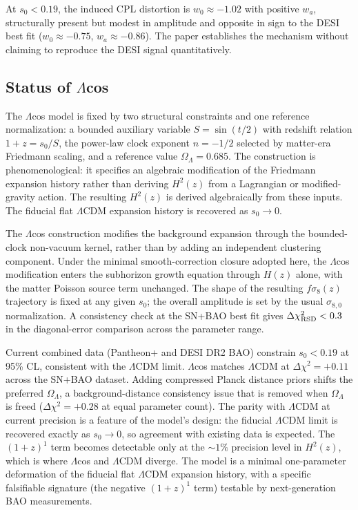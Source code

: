 \documentclass[
  aps,
  prd,
  onecolumn,         %
  nofootinbib,
  longbibliography
]{revtex4-2}
\begin{document}
At $s_0 < 0.19$, the induced CPL distortion
is $w_0 \approx -1.02$ with positive $w_a$, structurally present but modest in
amplitude and opposite in sign to the DESI best fit ($w_0 \approx -0.75$, $w_a \approx -0.86$). The paper establishes the mechanism without claiming to
reproduce the DESI signal quantitatively.

\pagebreak

\subsection{Status of $\Lambda$cos}\label{sec:disc-status}

The $\Lambda$cos model is fixed by two structural constraints and one
reference normalization: a bounded auxiliary variable $S = \sin(t/2)$
with redshift relation $1 + z = s_0/S$, the
power-law clock exponent $n = -1/2$ selected by matter-era Friedmann
scaling, and a reference value
$\Omega_\Lambda = 0.685$. The construction is
phenomenological: it specifies an algebraic modification of the
Friedmann expansion history rather than deriving $H^2(z)$ from a
Lagrangian or modified-gravity action. The resulting $H^2(z)$ is
derived algebraically from these inputs. The fiducial flat $\Lambda$CDM
expansion history is recovered as $s_0 \to 0$.

The $\Lambda$cos construction modifies the background expansion through the
bounded-clock non-vacuum kernel, rather than by adding an independent
clustering component. Under the minimal smooth-correction closure
adopted here, the $\Lambda$cos modification enters the subhorizon
growth equation through $H(z)$ alone, with the matter Poisson source
term unchanged. The shape of the resulting
$f\sigma_8(z)$ trajectory is fixed at any given $s_0$; the overall
amplitude is set by the usual $\sigma_{8,0}$ normalization. A
consistency check at the SN+BAO best fit gives $\Delta\chi^2_{\rm RSD} < 0.3$ in the
diagonal-error comparison across the parameter range.

\pagebreak

Current combined data (Pantheon+ and DESI DR2 BAO) constrain
$s_0 < 0.19$ at 95\% CL, consistent with the $\Lambda$CDM limit. $\Lambda$cos
matches $\Lambda$CDM at $\Delta\chi^2 = +0.11$ across the SN+BAO dataset. Adding compressed
Planck distance priors shifts the preferred $\Omega_\Lambda$, a background-distance
consistency issue that is removed when $\Omega_\Lambda$ is freed ($\Delta\chi^2 = +0.28$ at
equal parameter count). The parity with $\Lambda$CDM at current precision is a
feature of the model's design: the fiducial $\Lambda$CDM limit is recovered
exactly as $s_0 \to 0$, so agreement with existing data is expected. The
$(1+z)^1$ term becomes detectable only at the ${\sim}1\%$ precision
level in $H^2(z)$, which is where $\Lambda$cos and $\Lambda$CDM diverge. The model is a
minimal one-parameter deformation of the fiducial flat $\Lambda$CDM expansion
history, with a specific falsifiable signature (the negative $(1+z)^1$
term) testable by next-generation BAO measurements.
\end{document}
